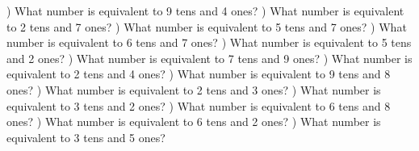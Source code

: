 \documentclass{article}%
\begin{document}
) What number is equivalent to 9 tens and 4 ones?%
\newline%
\newline%
) What number is equivalent to 2 tens and 7 ones?%
\newline%
\newline%
) What number is equivalent to 5 tens and 7 ones?%
\newline%
\newline%
) What number is equivalent to 6 tens and 7 ones?%
\newline%
\newline%
) What number is equivalent to 5 tens and 2 ones?%
\newline%
\newline%
) What number is equivalent to 7 tens and 9 ones?%
\newline%
\newline%
) What number is equivalent to 2 tens and 4 ones?%
\newline%
\newline%
) What number is equivalent to 9 tens and 8 ones?%
\newline%
\newline%
) What number is equivalent to 2 tens and 3 ones?%
\newline%
\newline%
) What number is equivalent to 3 tens and 2 ones?%
\newline%
\newline%
) What number is equivalent to 6 tens and 8 ones?%
\newline%
\newline%
) What number is equivalent to 6 tens and 2 ones?%
\newline%
\newline%
) What number is equivalent to 3 tens and 5 ones?%
\newline%
\newline%
\end{document}
